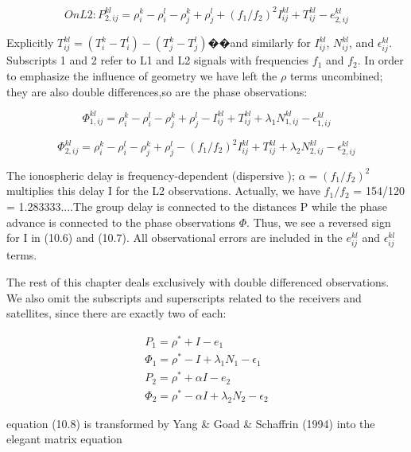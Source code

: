 \begin{equation}
On L2: P_{2,ij}^{kl}=\rho_{i}^{k}-\rho_{i}^{l}-\rho_{j}^{k}+\rho_{j}^{l}+(f_{1}/f_{2})^{2}I_{ij}^{kl}+T_{ij}^{kl}-e_{2,ij}^{kl}
\end{equation}

Explicitly $T_{ij}^{kl}=(T_{i}^{k}-T_{i}^{l})-(T_{j}^{k}-T_{j}^{l})$��and similarly for $I_{ij}^{kl}$, $N_{ij}^{kl}$, and $\epsilon_{ij}^{kl}$. Subscripts 1 and 2 refer to L1 and L2 signals with frequencies $f_{1}$ and $f_{2}$. In order to emphasize the influence of geometry we have left the $\rho$ terms uncombined; they are also double differences,so are the phase observations:

\begin{equation}
\Phi_{1,ij}^{kl}=\rho_{i}^{k}-\rho_{i}^{l}-\rho_{j}^{k}+\rho_{j}^{l}-I_{ij}^{kl}+T_{ij}^{kl}+\lambda_{1} N_{1,ij}^{kl}-\epsilon_{1,ij}^{kl}
\end{equation}

\begin{equation} \Phi_{2,ij}^{kl}=\rho_{i}^{k}-\rho_{i}^{l}-\rho_{j}^{k}+\rho_{j}^{l}-(f_{1}/f_{2})^{2}I_{ij}^{kl}+T_{ij}^{kl}+\lambda_{2} N_{2,ij}^{kl}-\epsilon_{2,ij}^{kl}
\end{equation}

The ionospheric delay is frequency-dependent (dispersive ); $\alpha=(f_{1}/f_{2})^{2}$ multiplies this delay I for the L2 observations. Actually, we have $f_{1}/f_{2}$ = 154/120 = 1.283333....The group delay is connected to the distances P while the phase advance is connected to the phase observations $\Phi$. Thus, we see a reversed sign for I in (10.6) and (10.7). All observational errors are included in the $e_{ij}^{kl}$ and $\epsilon_{ij}^{kl}$ terms.

The rest of this chapter deals exclusively with double differenced observations. We also omit the subscripts and superscripts related to the receivers and satellites, since there are exactly two of each:

\begin{equation}
\begin{split}
P_{1}=\rho^{*}+I-e_{1}\\
\Phi_{1}=\rho^{*}-I+\lambda_{1}N_{1}-\epsilon_{1}\\
P_{2}=\rho^{*}+\alpha I-e_{2}\\
\Phi_{2}=\rho^{*}-\alpha I+\lambda_{2}N_{2}-\epsilon_{2}
\end{split}
\end{equation}

equation (10.8) is transformed by Yang \& Goad \& Schaffrin (1994) into the elegant matrix equation

